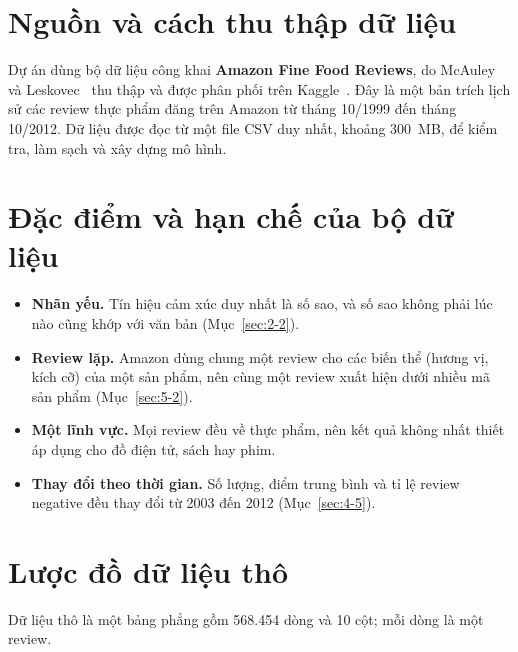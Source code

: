 \section{Nguồn và cách thu thập dữ liệu}
\label{sec:3-1}

Dự án dùng bộ dữ liệu công khai \textbf{Amazon Fine Food Reviews}, do McAuley và Leskovec~\cite{mcauley2013} thu thập và được phân phối trên Kaggle~\cite{kaggle_fine_food}. Đây là một bản trích lịch sử các review thực phẩm đăng trên Amazon từ tháng 10/1999 đến tháng 10/2012. Dữ liệu được đọc từ một file CSV duy nhất, khoảng 300~MB, để kiểm tra, làm sạch và xây dựng mô hình.

\section{Đặc điểm và hạn chế của bộ dữ liệu}
\label{sec:3-2}

\begin{itemize}
    \item \textbf{Nhãn yếu.} Tín hiệu cảm xúc duy nhất là số sao, và số sao không phải lúc nào cũng khớp với văn bản (Mục~\ref{sec:2-2}).
    \item \textbf{Review lặp.} Amazon dùng chung một review cho các biến thể (hương vị, kích cỡ) của một sản phẩm, nên cùng một review xuất hiện dưới nhiều mã sản phẩm (Mục~\ref{sec:5-2}).
    \item \textbf{Một lĩnh vực.} Mọi review đều về thực phẩm, nên kết quả không nhất thiết áp dụng cho đồ điện tử, sách hay phim.
    \item \textbf{Thay đổi theo thời gian.} Số lượng, điểm trung bình và tỉ lệ review negative đều thay đổi từ 2003 đến 2012 (Mục~\ref{sec:4-5}).
\end{itemize}

\section{Lược đồ dữ liệu thô}
\label{sec:3-3}

Dữ liệu thô là một bảng phẳng gồm 568.454 dòng và 10 cột; mỗi dòng là một review.

